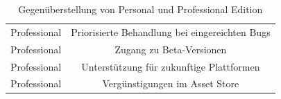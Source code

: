 \begin{table}[htbp]
{\begin{tabular}{cc}
			\rowcolor[HTML]{C0C0C0} 
			Professional                            & Priorisierte Behandlung bei eingereichten Bugs                                                                                        \\
			Professional                            & Zugang zu Beta-Versionen                                                                                                              \\
			\rowcolor[HTML]{C0C0C0} 
			Professional                            & Unterstützung für zukunftige Plattformen                                                                                              \\
			Professional                            & Vergünstigungen im Asset Store                                                                                                       
		\end{tabular}
	}
	\caption{Gegenüberstellung von Personal und Professional Edition}
	\label{Unity_Produkte}\citep{unity_products}
\end{table}





